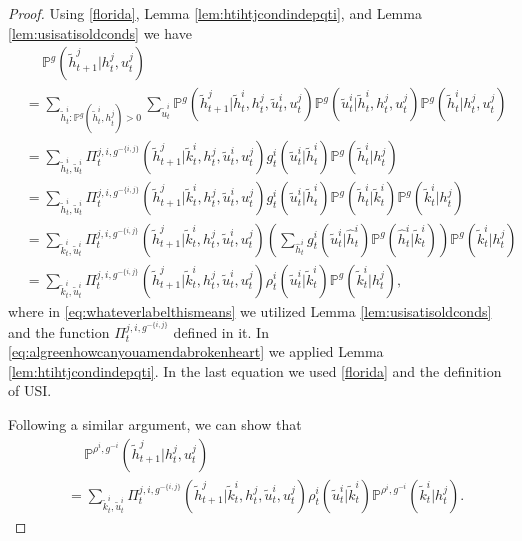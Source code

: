 \documentclass[pdflatex,sn-basic]{sn-jnl}
\renewcommand{\Pr}{\mathbb{P}}
\newcommand{\comp}{k}
\theoremstyle{thmstyleone}%
\theoremstyle{thmstyletwo}%
\theoremstyle{thmstylethree}%
\begin{document}
\begin{appendices}
\begin{proof}
	Using \eqref{florida}, Lemma \ref{lem:htihtjcondindepqti}, and Lemma \ref{lem:usisatisoldconds} we have
	\begin{align}
		&\quad~\Pr^g(\tilde{h}_{t+1}^j|h_t^j, u_t^j) \\
		&= \sum_{\tilde{h}_t^i: \Pr^{g}(\tilde{h}_t^i, h_t^j) > 0}\sum_{\tilde{u}_t^i} \Pr^g(\tilde{h}_{t+1}^j|\tilde{h}_t^i, h_t^j, \tilde{u}_t^i, u_t^j)\Pr^g(\tilde{u}_t^i|\tilde{h}_t^i, h_t^j, u_t^j)\Pr^g(\tilde{h}_t^i|h_t^j, u_t^j)\\
		&= \sum_{\tilde{h}_t^i, \tilde{u}_t^i} \Pi_t^{j, i, g^{-\{i, j\}}} (\tilde{h}_{t+1}^j|\tilde{\comp}_t^i, h_t^j, \tilde{u}_t^i, u_t^j) g_t^i(\tilde{u}_t^i|\tilde{h}_t^i) \Pr^g(\tilde{h}_t^i|h_t^j)\label{eq:whateverlabelthismeans} \\
		&=\sum_{\tilde{h}_t^i, \tilde{u}_t^i} \Pi_t^{j, i, g^{-\{i, j\}}} (\tilde{h}_{t+1}^j|\tilde{\comp}_t^i, h_t^j, \tilde{u}_t^i, u_t^j) g_t^i(\tilde{u}_t^i|\tilde{h}_t^i) \Pr^{g}(\tilde{h}_t^i|\tilde{\comp}_t^i)\Pr^g(\tilde{\comp}_t^i|h_t^j)\label{eq:algreenhowcanyouamendabrokenheart} \\
		&=\sum_{\tilde{\comp}_t^i, \tilde{u}_t^i} \Pi_t^{j, i, g^{-\{i, j\}}} (\tilde{h}_{t+1}^j|\tilde{\comp}_t^i, h_t^j, 	\tilde{u}_t^i, u_t^j) \left(\sum_{\hat{h}_t^i} g_t^i(\tilde{u}_t^i|\hat{h}_t^i) \Pr^{g}(\hat{h}_t^i|\tilde{\comp}_t^i)\right) \Pr^g(\tilde{\comp}_t^i|h_t^j)\\
		&=\sum_{\tilde{\comp}_t^i, \tilde{u}_t^i} \Pi_t^{j, i, g^{-\{i, j\}}} (\tilde{h}_{t+1}^j|\tilde{\comp}_t^i, h_t^j, 	\tilde{u}_t^i, u_t^j) \rho_t^i(\tilde{u}_t^i|\tilde{\comp}_t^i) \Pr^g(\tilde{\comp}_t^i|h_t^j),\label{georgia}
	\end{align}
    {where in \eqref{eq:whateverlabelthismeans} we utilized Lemma \ref{lem:usisatisoldconds} and the function $\Pi_t^{j, i, g^{-\{i, j\}}}$ defined in it. In \eqref{eq:algreenhowcanyouamendabrokenheart} we applied Lemma \ref{lem:htihtjcondindepqti}. In the last equation we used \eqref{florida} and the definition of USI. }
	
	Following a similar argument, we can show that
	\begin{align}
		&\quad~\Pr^{\rho^i, g^{-i}}(\tilde{h}_{t+1}^j|h_t^j, u_t^j) \\
		&=\sum_{\tilde{\comp}_t^i, \tilde{u}_t^i} \Pi_t^{j, i, g^{-\{i, j\}}} (\tilde{h}_{t+1}^j|\tilde{\comp}_t^i, h_t^j, 	\tilde{u}_t^i, u_t^j) \rho_t^i(\tilde{u}_t^i|\tilde{\comp}_t^i) \Pr^{\rho^i, g^{-i}}(\tilde{\comp}_t^i|h_t^j).\label{hawaii}
	\end{align}
	

\end{proof}
\end{appendices}
\end{document}
